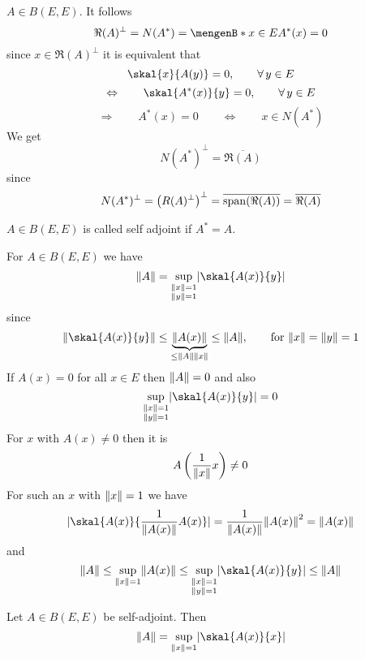 \begin{beispiel}
	$A \in B(E,E)$. It follows
	\[
		\Re(A)^{\perp} = N(A^*) = \set[x \in E]{A^*(x) = 0}
	\]
	since $x \in \Re(A)^{\perp}$ it is equivalent that
	\[
		\skal{x}{A(y)} = 0, \qquad \forall\, y \in E
	\] 
	\[
		\Leftrightarrow \qquad \skal{A^*(x)}{y} = 0, \qquad \forall\, y \in E
	\]
	\[
		\Rightarrow \qquad A^*(x) = 0 \qquad \Leftrightarrow \qquad x \in N(A^*)
	\]
	We get
	\[
		N(A^*)^{\perp} = \overline{\Re(A)}
	\]
	since
	\[
		N(A^*)^{\perp} = \left( R(A)^{\perp} \right)^{\perp} = \overline{\operatorname{span}(\Re(A))} = \overline{\Re(A)}
	\]
\end{beispiel}
\begin{bemerkung}
	$A \in B(E,E)$ is called self adjoint if $A^* = A$.
\end{bemerkung}
For $A \in B(E,E)$ we have
\[
	\norm{A} =\sup\limits_{\substack{\norm{x} = 1  \\ \norm{y}=1}} \abs{\skal{A(x)}{y}}
\]
since
\[
	\norm{\skal{A(x)}{y}} \leq \underset{\leq \norm{A}\norm{x}}{\underbrace{\norm{A(x)}}} \leq \norm{A}, \qquad \text{for }\norm{x}=\norm{y}=1
\]
If $A(x) = 0$ for all $x \in E$ then $\norm{A}=0$ and also
\[
	\sup\limits_{\substack{\norm{x} = 1  \\ \norm{y}=1}} \abs{\skal{A(x)}{y}} = 0
\]
For $x$ with $A(x) \neq 0$ then it is
\[
	A \left( \frac{1}{\norm{x}}x \right) \neq 0
\]
For such an $x$ with $\norm{x}=1$ we have
\[
	\abs{\skal{A(x)}{\frac{1}{\norm{A(x)}}A(x)}} = \frac{1}{\norm{A(x)}} \norm{A(x)}^2 = \norm{A(x)}
\]
and
\[
	\norm{A} \leq \sup_{\norm{x}=1} \norm{A(x)} \leq \sup\limits_{\substack{\norm{x} = 1  \\ \norm{y}=1}} \abs{\skal{A(x)}{y}} \leq \norm{A}
\]
\begin{proposition}
	Let $A \in B(E,E)$ be self-adjoint. Then
	\[
		\norm{A} = \sup_{\norm{x}=1} \abs{\skal{A(x)}{x}} 
	\]
\end{proposition}

